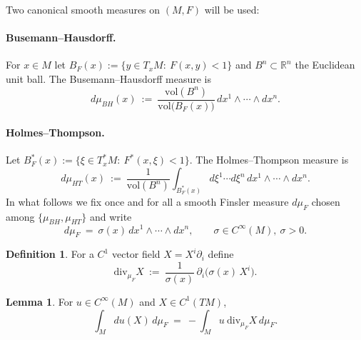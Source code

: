 \documentclass[fleqn,11pt,twoside]{article}
\theoremstyle{definition}
\newtheorem*{definition}{Definition}
\newtheorem{lemma}{Lemma}
\begin{document}
Two canonical smooth measures on $(M,F)$ will be used:

\paragraph{Busemann--Hausdorff.}
For $x\in M$ let $B_F(x):=\{y\in T_xM:\ F(x,y)<1\}$ and $B^n\subset\mathbb{R}^n$ the Euclidean unit ball.
The Busemann--Hausdorff measure is
\begin{equation}\label{eq:BH}
d\mu_{BH}(x)\ :=\ \frac{\mathrm{vol}(B^n)}{\mathrm{vol}\big(B_F(x)\big)}\,dx^1\wedge\cdots\wedge dx^n.
\end{equation}

\paragraph{Holmes--Thompson.}
Let $B^*_F(x):=\{\xi\in T_x^*M:\ F^*(x,\xi)<1\}$. The Holmes--Thompson measure is
\begin{equation}\label{eq:HT}
d\mu_{HT}(x)\ :=\
\frac{1}{\mathrm{vol}(B^n)}\!\int_{B^*_F(x)}\! d\xi^1\cdots d\xi^n\,dx^1\wedge\cdots\wedge dx^n.
\end{equation}
In what follows we fix once and for all a smooth Finsler measure $d\mu_F$ chosen among $\{\mu_{BH},\mu_{HT}\}$ and write
\begin{equation}\label{eq:mu-density}
d\mu_F\ =\ \sigma(x)\,dx^1\wedge\cdots\wedge dx^n,\qquad \sigma\in C^\infty(M),\ \sigma>0.
\end{equation}

\begin{definition}\label{def:div-muF}
For a $C^1$ vector field $X=X^i\partial_i$ define
\begin{equation}\label{eq:divergence}
\mathrm{div}_{\mu_F} X\ :=\ \frac{1}{\sigma(x)}\,\partial_i\!\big(\sigma(x)\,X^i\big).
\end{equation}
\end{definition}

\begin{lemma}\label{lem:ibp}
For $u\in C^\infty(M)$ and $X\in C^1(TM)$,
\begin{equation}\label{eq:ibp}
\int_M \! du(X)\,d\mu_F\ =\ -\int_M \! u\ \mathrm{div}_{\mu_F}X\,d\mu_F.
\end{equation}
\end{lemma}
\end{document}
